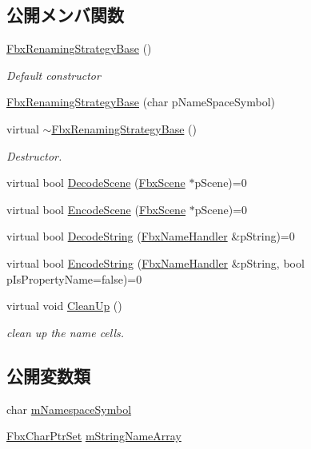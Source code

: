 \subsection*{公開メンバ関数}
\begin{DoxyCompactItemize}
\item 
\hyperlink{class_fbx_renaming_strategy_base_a96b05d890a49769ed329ffb79c052a54}{Fbx\+Renaming\+Strategy\+Base} ()
\begin{DoxyCompactList}\small\item\em Default constructor \end{DoxyCompactList}\item 
\hyperlink{class_fbx_renaming_strategy_base_a236910482755c3d7e0ee9d28d3b74a31}{Fbx\+Renaming\+Strategy\+Base} (char p\+Name\+Space\+Symbol)
\item 
virtual \hyperlink{class_fbx_renaming_strategy_base_a9c79c9c02fef4d3480bd7a4704fd2019}{$\sim$\+Fbx\+Renaming\+Strategy\+Base} ()
\begin{DoxyCompactList}\small\item\em Destructor. \end{DoxyCompactList}\item 
virtual bool \hyperlink{class_fbx_renaming_strategy_base_a6c368dff1424b4b54cdfa49ad49bf09c}{Decode\+Scene} (\hyperlink{class_fbx_scene}{Fbx\+Scene} $\ast$p\+Scene)=0
\item 
virtual bool \hyperlink{class_fbx_renaming_strategy_base_a7449fa6c649949d6d5e3c4b7190d6b25}{Encode\+Scene} (\hyperlink{class_fbx_scene}{Fbx\+Scene} $\ast$p\+Scene)=0
\item 
virtual bool \hyperlink{class_fbx_renaming_strategy_base_acc30037744da35fa2b59fdd4ff6d9ede}{Decode\+String} (\hyperlink{class_fbx_name_handler}{Fbx\+Name\+Handler} \&p\+String)=0
\item 
virtual bool \hyperlink{class_fbx_renaming_strategy_base_aa762726a9d92a328ec720f2b8135db09}{Encode\+String} (\hyperlink{class_fbx_name_handler}{Fbx\+Name\+Handler} \&p\+String, bool p\+Is\+Property\+Name=false)=0
\item 
virtual void \hyperlink{class_fbx_renaming_strategy_base_ae1ab8784f6769fce3068ee21e3c34196}{Clean\+Up} ()
\begin{DoxyCompactList}\small\item\em clean up the name cells. \end{DoxyCompactList}\end{DoxyCompactItemize}
\subsection*{公開変数類}
\begin{DoxyCompactItemize}
\item 
char \hyperlink{class_fbx_renaming_strategy_base_a9952264301fae41f0ecbc63bcaf1e7fa}{m\+Namespace\+Symbol}
\item 
\hyperlink{class_fbx_char_ptr_set}{Fbx\+Char\+Ptr\+Set} \hyperlink{class_fbx_renaming_strategy_base_a4cab3a7e42cbd982adc44841c38b02d0}{m\+String\+Name\+Array}
\end{DoxyCompactItemize}


